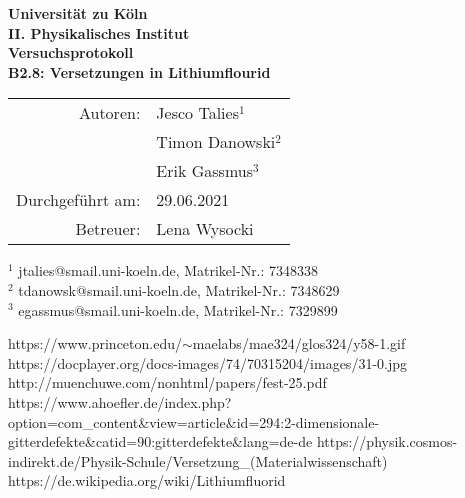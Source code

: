 ﻿\documentclass{article}
\begin{document}
 
 
\thispagestyle{empty}
\vspace*{\fill}
\begin{center}
	\Huge
	\textbf{Universität zu Köln}\\
	\LARGE
	\textbf{II. Physikalisches Institut}\\
	\vspace{2cm}
	\textbf{Versuchsprotokoll}\\  
	\vspace{0.5cm}
	\large
	\textbf{B2.8: Versetzungen in Lithiumflourid}\\
	\normalsize
	\vspace{2cm}
	\begin{tabular}{r l}
		Autoren: 	& Jesco Talies$^1$\\
					& Timon Danowski$^2$\\
                    & Erik Gassmus$^3$\\
		Durchgeführt am:	& 29.06.2021\\
		Betreuer:	& Lena Wysocki
	\end{tabular}
\end{center}
\vfill\footnotesize
$^1$ jtalies@smail.uni-koeln.de, Matrikel-Nr.:  7348338\\
$^2$ tdanowsk@smail.uni-koeln.de, Matrikel-Nr.: 7348629\\
$^3$ egassmus@smail.uni-koeln.de, Matrikel-Nr.: 7329899\\
\normalsize

\newpage
\thispagestyle{empty}
\tableofcontents
\clearpage
\setcounter{page}{1}
  
   
  

%
% 





\begin{thebibliography}{9}
		https://www.princeton.edu/$\sim$maelabs/mae324/glos324/y58-1.gif
		https://docplayer.org/docs-images/74/70315204/images/31-0.jpg
		http://muenchuwe.com/nonhtml/papers/fest-25.pdf
		https://www.ahoefler.de/index.php?option=com\_content\&view=article\&id=294:2-dimensionale-gitterdefekte\&catid=90:gitterdefekte\&lang=de-de
		https://physik.cosmos-indirekt.de/Physik-Schule/Versetzung\_(Materialwissenschaft)
		https://de.wikipedia.org/wiki/Lithiumfluorid
\end{thebibliography}
\end{document}
